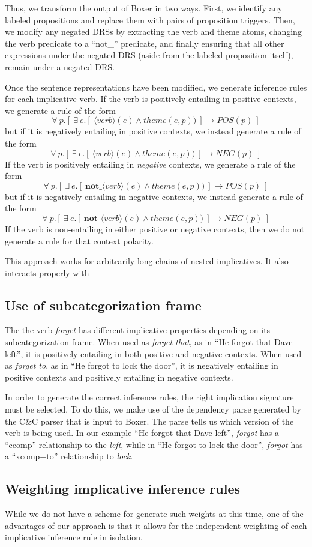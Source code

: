 Thus, we transform the output of Boxer in two ways.  First, we identify any
labeled propositions and replace them with pairs of proposition triggers.  Then,
we modify any negated DRSs by extracting the verb and theme atoms, changing the
verb predicate to a ``not\_'' predicate, and finally ensuring that all other
expressions under the negated DRS (aside from the labeled proposition itself),
remain under a negated DRS.

Once the sentence representations have been modified, we generate inference
rules for each implicative verb.  If the verb is positively entailing in
positive contexts, we generate a rule of the form 
\[ \forall~ p.[~ \exists~ e.[~ \langle verb \rangle(e) \land theme(e,p)) ~] \to POS(p) ~] \]
but if it is negatively entailing in positive contexts, we instead generate a rule of the form
\[ \forall~ p.[~ \exists~ e.[~ \langle verb \rangle(e) \land theme(e,p)) ~] \to NEG(p) ~] \]
If the verb is positively entailing in {\it negative} contexts, we generate a rule of the form
\[ \forall~ p.[~ \exists~ e.[~ \textbf{not\_}\langle verb \rangle(e) \land theme(e,p)) ~] \to POS(p) ~] \]
but if it is negatively entailing in negative contexts, we instead generate a rule of the form
\[ \forall~ p.[~ \exists~ e.[~ \textbf{not\_}\langle verb \rangle(e) \land theme(e,p)) ~] \to NEG(p) ~] \]
If the verb is non-entailing in either positive or negative contexts, then we do
not generate a rule for that context polarity. 

This approach works for arbitrarily long chains of nested implicatives.  It also
interacts properly with 



\subsection*{Use of subcategorization frame}

The the verb {\it forget} has different implicative properties depending on its
subcategorization frame.  When used as {\it forget that}, as in ``He forgot that
Dave left'', it is positively entailing in both positive and negative contexts. 
When used as {\it forget to}, as in ``He forgot to lock the door'', it is
negatively entailing in positive contexts and positively entailing in negative
contexts.

In order to generate the correct inference rules, the right implication
signature must be selected.  To do this, we make use of the dependency parse
generated by the C\&C parser that is input to Boxer.  The parse tells us which
version of the verb is being used.  In our example ``He forgot that
Dave left'', {\it forgot} has a ``ccomp'' relationship to the {\it left}, while
in ``He forgot to lock the door'', {\it forgot} has a ``xcomp+to'' relationship
to {\it lock}.



\subsection*{Weighting implicative inference rules}

While we do not have a scheme for generate such weights at this time, one of the
advantages of our approach is that it allows for the independent weighting of
each implicative inference rule in isolation.  

